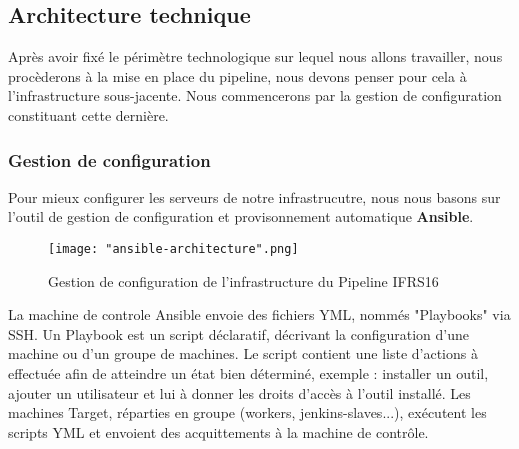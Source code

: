 \begin{spacing}{1.2}
\subsection{Architecture technique}
Après avoir fixé le périmètre technologique sur lequel nous allons travailler, nous procèderons à la mise en place du pipeline, nous devons penser pour cela à l’infrastructure sous-jacente. Nous commencerons par la gestion de configuration constituant cette dernière.
\vspace{0mm}
\subsubsection{Gestion de configuration}
Pour mieux configurer les serveurs de notre infrastrucutre, nous nous basons sur l'outil de gestion de configuration et provisonnement automatique \textbf{Ansible}. 
\begin{figure}[!ht]\centering
\texttt{[image: "ansible-architecture".png]}
\caption{Gestion de configuration de l'infrastructure du Pipeline IFRS16}
\label{fig:fig1}
\end{figure}
\FloatBarrier
\vspace{2mm}
La machine de controle Ansible envoie des fichiers YML, nommés "Playbooks" via SSH. Un Playbook est un script déclaratif, décrivant la configuration d'une machine ou d'un groupe de machines. Le script contient une liste d'actions à effectuée afin de atteindre un état bien déterminé, exemple : installer un outil, ajouter un utilisateur et lui à donner les droits d'accès à l'outil installé. Les machines Target, réparties en groupe (workers, jenkins-slaves...), exécutent les scripts YML et envoient des acquittements à la machine de contrôle. 

\end{spacing}
